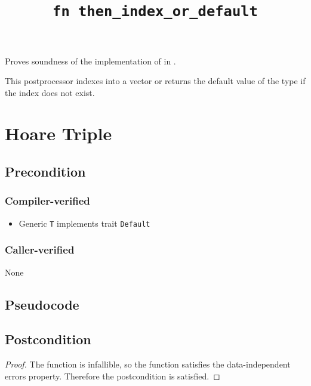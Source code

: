 \documentclass{article}
\title{\texttt{fn then\_index\_or\_default}}
\author{\MichaelShoemateAuthor}
\date{}
\begin{document}
\maketitle

\contrib
Proves soundness of the implementation of  in .

This postprocessor indexes into a vector or returns the default value of the type if the index does not exist.
\section{Hoare Triple}
\subsection*{Precondition}
\subsubsection*{Compiler-verified}
\begin{itemize}
    \item Generic \texttt{T} implements trait \texttt{Default}
\end{itemize}

\subsubsection*{Caller-verified}
None

\subsection*{Pseudocode}


\subsection*{Postcondition}
\begin{theorem}
\end{theorem}

\begin{proof}
    The function is infallible, so the function satisfies the data-independent errors property.
    Therefore the postcondition is satisfied.
\end{proof}
\end{document}
